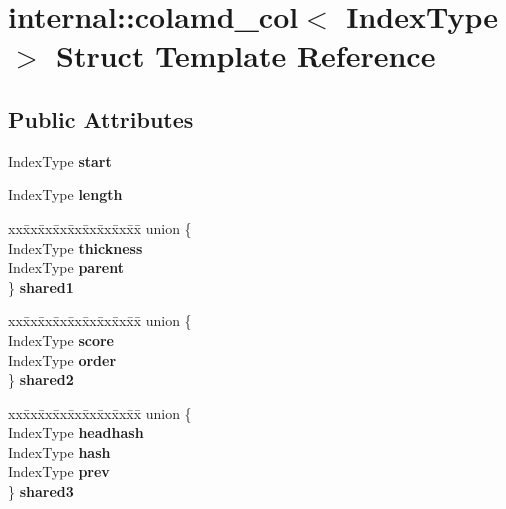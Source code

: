 \hypertarget{structinternal_1_1colamd__col}{}\section{internal\+::colamd\+\_\+col$<$ Index\+Type $>$ Struct Template Reference}
\label{structinternal_1_1colamd__col}
\subsection*{Public Attributes}
\begin{DoxyCompactItemize}
\item 
\mbox{\label{structinternal_1_1colamd__col_a127a40c2b27808cd35f80a9d565d1634}} 
Index\+Type {\bfseries start}
\item 
\mbox{\label{structinternal_1_1colamd__col_ace6c1dba33e5567803b3ac65102d0505}} 
Index\+Type {\bfseries length}
\item 
\mbox{\label{structinternal_1_1colamd__col_a70ec9bd08e947fb15e896525544e8ab7}} 
\begin{tabbing}
xx\=xx\=xx\=xx\=xx\=xx\=xx\=xx\=xx\=\kill
union \{\\
\>IndexType {\bfseries thickness}\\
\>IndexType {\bfseries parent}\\
\} {\bfseries shared1}\\

\end{tabbing}\item 
\mbox{\label{structinternal_1_1colamd__col_a3dae5d7438b05ca1d9968f45628f1d17}} 
\begin{tabbing}
xx\=xx\=xx\=xx\=xx\=xx\=xx\=xx\=xx\=\kill
union \{\\
\>IndexType {\bfseries score}\\
\>IndexType {\bfseries order}\\
\} {\bfseries shared2}\\

\end{tabbing}\item 
\mbox{\label{structinternal_1_1colamd__col_aa27200906322ead75e49c07476a17890}} 
\begin{tabbing}
xx\=xx\=xx\=xx\=xx\=xx\=xx\=xx\=xx\=\kill
union \{\\
\>IndexType {\bfseries headhash}\\
\>IndexType {\bfseries hash}\\
\>IndexType {\bfseries prev}\\
\} {\bfseries shared3}\\


\end{tabbing}
\end{DoxyCompactItemize}
